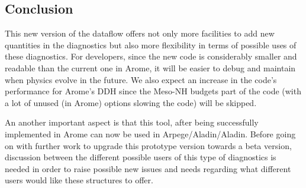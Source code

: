 \subsection{Conclusion}

This new version of the dataflow offers not only more facilities to add new
quantities in the diagnostics but also more flexibility in terms of possible
uses of these diagnostics. For developers, since the new code is considerably
smaller and readable than the current one in Arome, it will be easier to debug
and maintain when physics evolve in the future. We also expect an increase in
the code's performance for Arome's DDH since the Meso-NH budgets part of the
code (with a lot of unused (in Arome) options slowing the code) will be skipped.

An another important aspect is that this tool, after being successfully
implemented in Arome can now be used in Arpege/Aladin/Aladin. Before going on
with further work to upgrade this prototype version towards a beta version,
discussion between the different possible users of this type of diagnostics is
needed in order to raise possible new issues and needs regarding what different
users would like these structures to offer.

